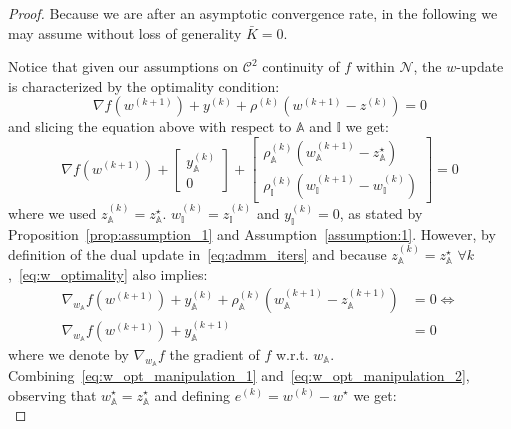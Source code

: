 \documentclass[letterpaper, 10 pt, conference]{ieeeconf}  %
\begin{document}
\begin{proof}
Because we are after an asymptotic convergence rate, in the following we may assume without loss of generality $\bar{K} = 0$.

Notice that given our assumptions on $\mathcal{C}^2$ continuity of $f$ within $\mathcal{N}$, the $w$-update is characterized by the optimality condition:
\begin{equation}
\label{eq:w_optimality}
\nabla f(w^{(k+1)}) + y^{(k)} + \rho^{(k)} (w^{(k+1)} - z^{(k)}) = 0
\end{equation}
and slicing the equation above with respect to $\mathbb{A}$ and $\mathbb{I}$ we get:
\begin{equation}
\label{eq:w_opt_manipulation_1}
\nabla f(w^{(k+1)}) + \begin{bmatrix}
    y_{\mathbb{A}}^{(k)} \\
    0
\end{bmatrix} + \begin{bmatrix}
    \rho_{\mathbb{A}}^{(k)} (w_{\mathbb{A}}^{(k+1)} - z_{\mathbb{A}}^{\star}) \\
    \rho_{\mathbb{I}}^{(k)} (w_{\mathbb{I}}^{(k+1)} - w_{\mathbb{I}}^{(k)})
\end{bmatrix} = 0
\end{equation}
where we used $z^{(k)}_\mathbb{A} = z_\mathbb{A}^{\star}$. $w_\mathbb{I}^{(k)} = z_\mathbb{I}^{(k)}$ and $y_{\mathbb{I}}^{(k)} = 0$, as stated by Proposition~\ref{prop:assumption_1} and Assumption~\ref{assumption:1}. However, by definition of the dual update in~\eqref{eq:admm_iters} and because $z_\mathbb{A}^{(k)} = z_\mathbb{A}^{\star}$ $\forall k$,~\eqref{eq:w_optimality} also implies:
\begin{equation}
\label{eq:w_opt_manipulation_2}
\begin{aligned}
\nabla_{w_{\mathbb{A}}} f(w^{(k+1)}) + y_{\mathbb{A}}^{(k)} + \rho_{\mathbb{A}}^{(k)} (w_{\mathbb{A}}^{(k+1)} - z_{\mathbb{A}}^{(k+1)}) &= 0 \iff \\
\nabla_{w_{\mathbb{A}}} f(w^{(k+1)}) + y_{\mathbb{A}}^{(k+1)} &= 0
\end{aligned}
\end{equation}
where we denote by $\nabla_{w_{\mathbb{A}}}f$ the gradient of $f$ w.r.t. $w_{\mathbb{A}}$. Combining~\eqref{eq:w_opt_manipulation_1} and~\eqref{eq:w_opt_manipulation_2}, observing that $w_{\mathbb{A}}^{\star} = z_{\mathbb{A}}^{\star}$ and defining $e^{(k)} = w^{(k)} - w^{\star}$ we get:
\begin{equation}
\label{eq:gradients_errors}

\end{equation}
\end{proof}
\end{document}
